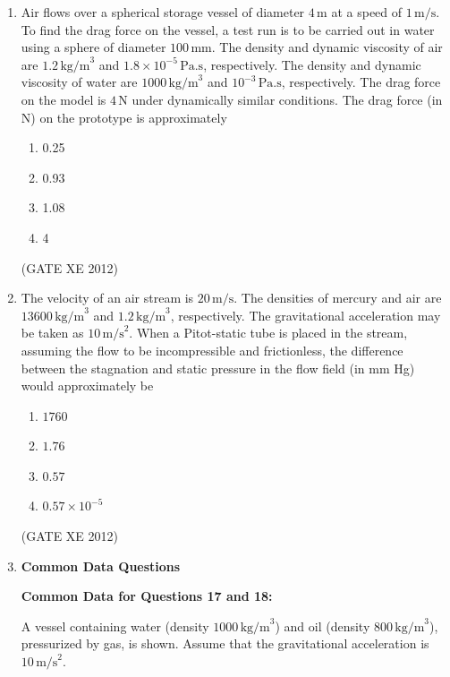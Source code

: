 \documentclass[12pt]{article}
\begin{document}
\begin{enumerate}
(GATE XE 2012)

\item Air flows over a spherical storage vessel of diameter $4 \, \text{m}$ at a speed of $1 \, \text{m/s}$. To find the drag force on the vessel, a test run is to be carried out in water using a sphere of diameter $100 \, \text{mm}$. The density and dynamic viscosity of air are $1.2 \, \text{kg/m}^{3}$ and $1.8 \times 10^{-5} \, \text{Pa.s}$, respectively. The density and dynamic viscosity of water are $1000 \, \text{kg/m}^{3}$ and $10^{-3} \, \text{Pa.s}$, respectively. The drag force on the model is $4 \, \text{N}$ under dynamically similar conditions. The drag force (in N) on the prototype is approximately
\begin{multicols}{4}
\begin{enumerate}
\item 0.25
\item 0.93
\item 1.08
\item 4
\end{enumerate}
\end{multicols}

(GATE XE 2012)

\item The velocity of an air stream is $20 \, \text{m/s}$. The densities of mercury and air are $13600 \, \text{kg/m}^{3}$ and $1.2 \, \text{kg/m}^{3}$, respectively. The gravitational acceleration may be taken as $10 \, \text{m/s}^{2}$. When a Pitot-static tube is placed in the stream, assuming the flow to be incompressible and frictionless, the difference between the stagnation and static pressure in the flow field (in mm Hg) would approximately be
\begin{multicols}{4}
\begin{enumerate}
\item $1760$
\item $1.76$
\item $0.57$
\item $0.57 \times 10^{-5}$
\end{enumerate}
\end{multicols}

(GATE XE 2012)



\item[] {\large\textbf{Common Data Questions} }

\textbf{Common Data for Questions 17 and 18:}  

A vessel containing water (density $1000 \, \text{kg/m}^{3}$) and oil (density $800 \, \text{kg/m}^{3}$), pressurized by gas, is shown. Assume that the gravitational acceleration is $10 \, \text{m/s}^{2}$.  


\end{enumerate}
\end{document}
